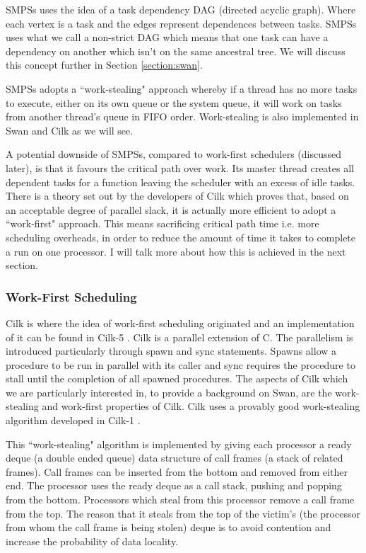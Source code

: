 SMPSs uses the idea of a task dependency DAG (directed acyclic graph). Where each vertex is a task and 
the edges represent dependences between tasks. SMPSs uses what we call a non-strict DAG which means 
that one task can have a dependency on another which isn't on the same ancestral tree. We will discuss 
this concept further in Section \ref{section:swan}.

SMPSs adopts a ``work-stealing" approach whereby if a thread has no more tasks to execute, either on 
its own queue or the system queue, it will work on tasks from another thread's queue in FIFO order. 
Work-stealing is also implemented in Swan and Cilk as we will see.

A potential downside of SMPSs, compared to work-first schedulers (discussed later), is that it favours the 
critical path over work. Its master thread creates all dependent tasks for a function leaving the scheduler 
with an excess of idle tasks. There is a theory set out by the developers of Cilk \citep{id5} which proves 
that, based on an acceptable degree of parallel slack, it is actually more efficient to adopt a ``work-first" 
approach. This means sacrificing critical path time i.e. more scheduling overheads, in order to reduce the 
amount of time it takes to complete a run on one processor. I will talk more about how this is achieved in 
the next section.

\subsubsection{Work-First Scheduling}
\label{clik5}
\label{section:workfirst}

Cilk is where the idea of work-first scheduling originated and an implementation of it can be found in 
Cilk-5 \citep{id5}. Cilk is a parallel extension of C. The parallelism is introduced particularly through 
spawn and sync statements. Spawns allow a procedure to be run in parallel with its caller and sync 
requires the procedure to stall until the completion of all spawned procedures. The aspects of Cilk which 
we are particularly interested in, to provide a background on Swan, are the work-stealing and work-first 
properties of Cilk. Cilk uses a provably good work-stealing algorithm developed in Cilk-1 \citep{id13, 
id14, id15}.

This ``work-stealing" algorithm is implemented by giving each processor a ready deque (a double ended 
queue) data structure of call frames (a stack of related frames). Call frames can be inserted from the 
bottom and removed from either end. The processor uses the ready deque as a call stack, pushing and 
popping from the bottom. Processors which steal from this processor remove a call frame from the top. 
The reason that it steals from the top of the victim's (the processor from whom the call frame is being 
stolen) deque is to avoid contention and increase the probability of data locality.

